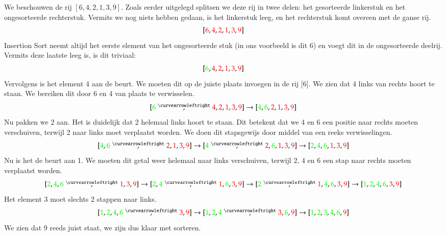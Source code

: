 \begin{example} \label{example:sorteer:insertion}
\newcommand{\IN}[1]{{\color{red}#1}}
\newcommand{\OUT}[1]{{\color{green}#1}}
\newcommand{\swap}{\stackrel{\curvearrowleftright}{,}}
We beschouwen de rij $[6,4,2,1,3,9]$. Zoals eerder uitgelegd splitsen we deze
rij in twee delen: het gesorteerde linkerstuk en het ongesorteerde rechterstuk.
Vermits we nog niets hebben gedaan, is het linkerstuk leeg, en het rechterstuk
komt overeen met de ganse rij.
\[
  [ \IN6, \IN4, \IN2, \IN1, \IN3, \IN9 ]
\]
Insertion Sort neemt altijd het eerste element van het ongesorteerde stuk
(in ons voorbeeld is dit $6$) en voegt dit in de ongesorteerde deelrij.
Vermits deze laatste leeg is, is dit triviaal:
\[
  [ \OUT6, \IN4, \IN2, \IN1, \IN3, \IN9 ]
\]
Vervolgens is het element 4 aan de beurt. We moeten dit op de juiste plaats
invoegen in de rij [\OUT6]. We zien dat 4 links van rechts hoort te staan.
We bereiken dit door 6 en 4 van plaats te verwisselen.
\[
  [ \OUT6 \swap \IN4, \IN2, \IN1, \IN3, \IN9 ] \rightarrow [ \OUT4, \OUT6, \IN2, \IN1, \IN3, \IN9 ]
\]
Nu pakken we 2 aan. Het is duidelijk dat 2 helemaal links hoort te staan.
Dit betekent dat we 4 en 6 een positie naar rechts moeten verschuiven,
terwijl 2 naar links moet verplaatst worden. We doen dit stapsgewijs door middel van een reeks verwisselingen.
\[
  [ \OUT4, \OUT6 \swap \IN2, \IN1, \IN3, \IN9 ]
  \rightarrow
  [ \OUT4 \swap \IN2, \OUT6, \IN1, \IN3, \IN9 ]
  \rightarrow
  [ \OUT2, \OUT4, \OUT6, \IN1, \IN3, \IN9 ]
\]
Nu is het de beurt aan 1. We moeten dit getal weer helemaal naar links verschuiven,
terwijl 2, 4 en 6 een stap naar rechts moeten verplaatst worden.
\[
  [ \OUT2, \OUT4, \OUT6 \swap \IN1, \IN3, \IN9 ]
  \rightarrow
  [ \OUT2, \OUT4 \swap \IN1, \OUT6, \IN3, \IN9 ]
  \rightarrow
  [ \OUT2 \swap \IN1, \OUT4, \OUT6, \IN3, \IN9 ]
  \rightarrow
  [ \OUT1, \OUT2, \OUT4, \OUT6, \IN3, \IN9 ]
\]
Het element 3 moet slechts 2 stappen naar links.
\[
  [ \OUT1, \OUT2, \OUT4, \OUT6 \swap \IN3, \IN9 ]
  \rightarrow
  [ \OUT1, \OUT2, \OUT4 \swap \IN3, \OUT6, \IN9 ]
  \rightarrow
  [ \OUT1, \OUT2, \OUT3, \OUT4, \OUT6, \IN9 ]
\]
We zien dat 9 reeds juist staat, we zijn dus klaar met sorteren.
\end{example}


